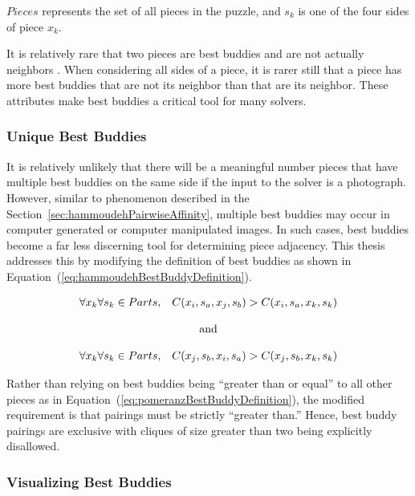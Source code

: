 \documentclass{report}
\def\eref#1{(\ref{#1})}
\begin{document}
\noindent
${Pieces}$ represents the set of all pieces in the puzzle, and $s_k$ is one of the four sides of piece $x_k$.

It is relatively rare that two pieces are best buddies and are not actually neighbors \cite{paikin2015}.  When considering all sides of a piece, it is rarer still that a piece has more best buddies that are not its neighbor than that are its neighbor.  These attributes make best buddies a critical tool for many solvers.

\subsubsection{Unique Best Buddies}\label{sec:improvedBestBuddies}

It is relatively unlikely that there will be a meaningful number pieces that have multiple best buddies on the same side if the input to the solver is a photograph.  However, similar to phenomenon described in the Section~\ref{sec:hammoudehPairwiseAffinity}, multiple best buddies may occur in computer generated or computer manipulated images.  In such cases, best buddies become a far less discerning tool for determining piece adjacency.  This thesis addresses this by modifying the definition of best buddies as shown in Equation~\eref{eq:hammoudehBestBuddyDefinition}.

\begin{equation} \label{eq:hammoudehBestBuddyDefinition}
\begin{split}
\begin{matrix}
\forall{x_k} \forall{s_k} \in Parts, & C(x_i, s_a, x_j, s_b) > C(x_i, s_a, x_k, s_k)
\\
\\
\multicolumn{2}{c}{\textnormal{and}}
\\
\\
\forall{x_k} \forall{s_k} \in Parts, & C(x_j, s_b, x_i, s_a) > C(x_j, s_b, x_k, s_k)
\end{matrix}
\end{split}
\end{equation}

Rather than relying on best buddies being ``greater than or equal'' to all other pieces as in Equation~\eref{eq:pomeranzBestBuddyDefinition}, the modified requirement is that pairings must be strictly ``greater than.''  Hence, best buddy pairings are exclusive with cliques of size greater than two being explicitly disallowed.

\subsubsection{Visualizing Best Buddies}\label{sec:visualizingBestBuddies}
\end{document}
